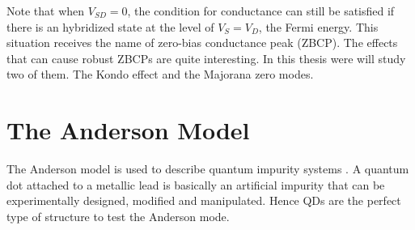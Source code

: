 Note that when $V_{SD}=0$, the condition for conductance can still be satisfied if there is an hybridized state at the level of $V_S = V_D$,  the Fermi energy. This situation receives the name of zero-bias conductance peak (ZBCP). The effects that can cause robust ZBCPs are quite interesting. In this thesis were will study two of them. The Kondo effect and the Majorana zero modes. 













\section{The Anderson Model \label{sec:Anderson}}

 The Anderson model is used to describe quantum impurity systems \citep{anderson_localized_1961}. A quantum dot attached to a metallic lead is basically an artificial impurity that can be experimentally designed, modified and manipulated. Hence QDs are the perfect type of structure to test the Anderson mode.   

